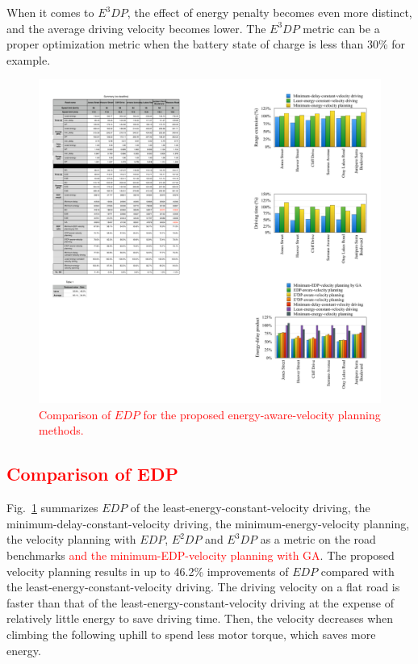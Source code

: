 \documentclass{IEEEtran}
\begin{document}
When it comes to $E^3DP$, the effect of energy penalty becomes even more distinct, and the average driving velocity becomes lower. 
The $E^3DP$ metric can be a proper optimization metric when the battery state of charge is less than 30\% for example.

\begin{figure}	 
\centering
\includegraphics[width=\hsize]{Figures/EDP_comp_bar.pdf}
\caption{\textcolor{red}{Comparison of $EDP$ for the proposed energy-aware-velocity planning methods.}}
\label{fig:EDP_bar}
\end{figure} 

\textcolor{red}{\subsection{Comparison of EDP}}

Fig.~\ref{fig:EDP_bar} summarizes $EDP$ of the least-energy-constant-velocity driving, the minimum-delay-constant-velocity driving, the minimum-energy-velocity planning, the velocity planning with $EDP$, $E^2DP$ and $E^3DP$ as a metric on the road benchmarks \textcolor{red}{and the minimum-EDP-velocity planning with GA}. The proposed velocity planning results in up to 46.2\% improvements of $EDP$ compared with the least-energy-constant-velocity driving. 
The driving velocity on a flat road is faster than that of the least-energy-constant-velocity driving at the expense of relatively little energy to save driving time. Then, the velocity decreases when climbing the following uphill to spend less motor torque, which saves more energy.
\end{document}
